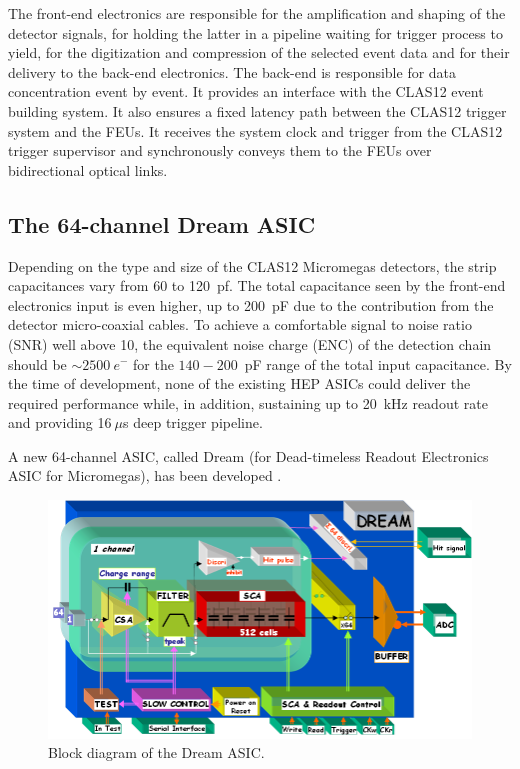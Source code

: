 The front-end electronics are responsible for the amplification and shaping of the detector signals, for holding the latter in a pipeline waiting for trigger process to yield, for the digitization and compression of the selected event data and for their delivery to the back-end electronics. The back-end is responsible for data concentration event by event. It provides an interface with the CLAS12 event building system. It also ensures a fixed latency path between the CLAS12 trigger system and the FEUs. It receives the system clock and trigger from the CLAS12 trigger supervisor and synchronously conveys them to the FEUs over bidirectional optical links.

\subsection{The 64-channel Dream ASIC}
Depending on the type and size of the CLAS12 Micromegas detectors, the strip capacitances vary from 60 to 120~pf. The total capacitance seen by the front-end electronics input is even higher, up to 200~pF due to the contribution from the detector micro-coaxial cables. To achieve a comfortable signal to noise ratio (SNR) well above 10, the equivalent noise charge (ENC) of the detection chain should be $\sim2500~e^-$ for the $140-200$~pF range of the total input capacitance. By the time of development, none of the existing HEP ASICs could deliver the required performance while, in addition, sustaining up to 20~kHz readout rate and providing 16$~\mu$s deep trigger pipeline.

A new 64-channel ASIC, called Dream (for Dead-timeless Readout Electronics ASIC for Micromegas), has been developed \cite{DRM}. 

\begin{figure}[htb]
 \includegraphics[width=1.0\columnwidth,keepaspectratio]{images/electronics_fig2.png}
 \caption{Block diagram of the Dream ASIC.}
 \label{fig:mm-e_2}
\end{figure}

